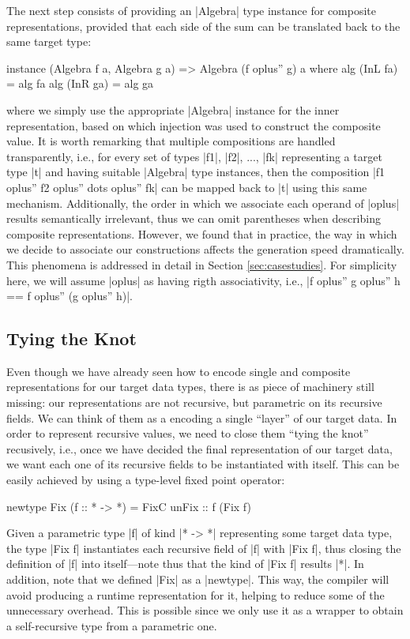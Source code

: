 The next step consists of providing an |Algebra| type instance for composite
representations, provided that each side of the sum can be translated back to
the same target type:

\begin{code}
instance (Algebra f a, Algebra g a) => Algebra (f oplus'' g) a
  where  alg (InL fa) = alg fa
         alg (InR ga) = alg ga
\end{code}

where we simply use the appropriate |Algebra| instance for the inner
representation, based on which injection was used to construct the composite
value.
%
It is worth remarking that multiple compositions are handled transparently,
i.e., for every set of types |f1|, |f2|, ..., |fk| representing a target type
|t| and having suitable |Algebra| type instances, then the composition |f1
oplus'' f2 oplus'' dots oplus'' fk| can be mapped back to |t| using this same
mechanism.
%
Additionally, the order in which we associate each operand of |oplus| results
semantically irrelevant, thus we can omit parentheses when describing composite
representations.
%
However, we found that in practice, the way in which we decide to associate our
constructions affects the generation speed dramatically.
%
This phenomena is addressed in detail in Section \ref{sec:casestudies}.
%
For simplicity here, we will assume |oplus| as having rigth associativity, i.e.,
|f oplus'' g oplus'' h == f oplus'' (g oplus'' h)|.


%
\subsection{Tying the Knot}

Even though we have already seen how to encode single and composite
representations for our target data types, there is as piece of machinery still
missing: our representations are not recursive, but parametric on its recursive
fields.
%
We can think of them as a encoding a single ``layer'' of our target data.
%
In order to represent recursive values, we need to close them ``tying the knot''
recusively, i.e., once we have decided the final representation of our target
data, we want each one of its recursive fields to be instantiated with itself.
%
This can be easily achieved by using a type-level fixed point operator:

\begin{code}
newtype Fix (f :: * -> *) = FixC { unFix :: f (Fix f) }
\end{code}
%
Given a parametric type |f| of kind |* -> *| representing some target data type,
the type |Fix f| instantiates each recursive field of |f| with |Fix f|, thus
closing the definition of |f| into itself---note thus that the kind of |Fix f|
results |*|.
%
In addition, note that we defined |Fix| as a |newtype|.
%
This way, the compiler will avoid producing a runtime representation for it,
helping to reduce some of the unnecessary overhead.
%
This is possible since we only use it as a wrapper to obtain a self-recursive
type from a parametric one.


